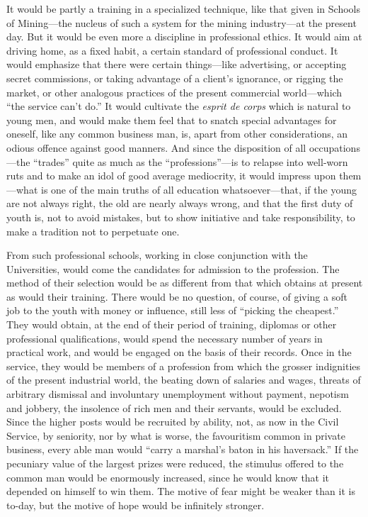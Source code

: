 \documentclass{book}
\begin{document}
It would be partly a training in a specialized technique, like that given in Schools of Mining—the nucleus of such a system for the mining industry—at the present day. But it would be even more a discipline in professional ethics. It would aim at driving home, as a fixed habit, a certain standard of professional conduct. It would emphasize that there were certain things—like advertising, or accepting secret commissions, or taking advantage of a client’s ignorance, or rigging the market, or other analogous practices of the present commercial world—which “the service can’t do.” It would cultivate the \emph{esprit de corps} which is natural to young men, and would make them feel that to snatch special advantages for oneself, like any common business man, is, apart from other considerations, an odious offence against good manners. And since the disposition of all occupations—the “trades” quite as much as the “professions”—is to relapse into well-worn ruts and to make an idol of good average mediocrity, it would impress upon them—what is one of the main truths of all education whatsoever—that, if the young are not always right, the old are nearly always wrong, and that the first duty of youth is, not to avoid mistakes, but to show initiative and take responsibility, to make a tradition not to perpetuate one.

From such professional schools, working in close conjunction with the Universities, would come the candidates for admission to the profession. The method of their selection would be as different from that which obtains at present as would their training. There would be no question, of course, of giving a soft job to the youth with money or influence, still less of “picking the cheapest.” They would obtain, at the end of their period of training, diplomas or other professional qualifications, would spend the necessary number of years in practical work, and would be engaged on the basis of their records. Once in the service, they would be members of a profession from which the grosser indignities of the present industrial world, the beating down of salaries and wages, threats of arbitrary dismissal and involuntary unemployment without payment, nepotism and jobbery, the insolence of rich men and their servants, would be excluded. Since the higher posts would be recruited by ability, not, as now in the Civil Service, by seniority, nor by what is worse, the favouritism common in private business, every able man would “carry a marshal’s baton in his haversack.” If the pecuniary value of the largest prizes were reduced, the stimulus offered to the common man would be enormously increased, since he would know that it depended on himself to win them. The motive of fear might be weaker than it is to-day, but the motive of hope would be infinitely stronger.
\end{document}

